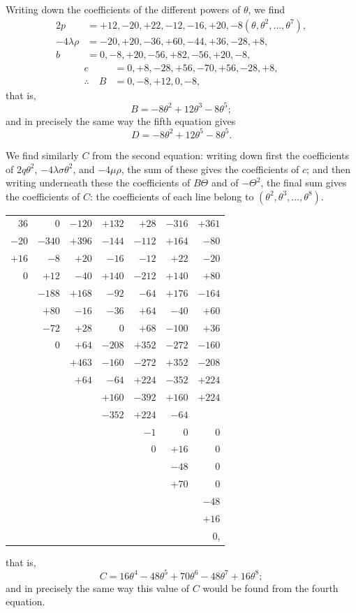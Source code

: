\documentclass[11pt,a4paper]{book}
\begin{document}
Writing down the coefficients of the different powers of $\theta$, we find
\begin{align*}
2p &= +12, -20, +22, -12, -16, +20, -8 (\theta, \theta^2, \ldots, \theta^7),\\
-4\lambda\rho &= -20, +20, -36, +60, -44, +36, -28, +8,\\
b &= 0, -8, +20, -56, +82, -56, +20, -8,
\end{align*}
\begin{align*}
e &= 0, +8, -28, +56, -70, +56, -28, +8,\\
\therefore\quad B &= 0, -8, +12, 0, -8,
\end{align*}
that is,
\[
B = -8\theta^2 + 12\theta^3 - 8\theta^5;
\]
and in precisely the same way the fifth equation gives
\[
D = -8\theta^2 + 12\theta^5 - 8\theta^5.
\]

We find similarly $C$ from the second equation: writing down first the coefficients of $2q\theta^2$, $-4\lambda\sigma\theta^2$, and $-4\mu\rho$, the sum of these gives the coefficients of $c$; and then writing underneath these the coefficients of $B\Theta$ and of $-\Theta^2$, the final sum gives the coefficients of $C$: the coefficients of each line belong to $(\theta^2, \theta^3, \ldots, \theta^8)$.
\begin{center}
\begin{tabular}{r@{\ }r@{\ }r@{\ }r@{\ }r@{\ }r@{\ }r}
36 & 0 & $-120$ & $+132$ & $+28$ & $-316$ & $+361$ \\
$-20$ & $-340$ & $+396$ & $-144$ & $-112$ & $+164$ & $-80$ \\
$+16$ & $-8$ & $+20$ & $-16$ & $-12$ & $+22$ & $-20$ \\
\midrule
0 & $+12$ & $-40$ & $+140$ & $-212$ & $+140$ & $+80$ \\
& $-188$ & $+168$ & $-92$ & $-64$ & $+176$ & $-164$ \\
& $+80$ & $-16$ & $-36$ & $+64$ & $-40$ & $+60$ \\
\midrule
& $-72$ & $+28$ & 0 & $+68$ & $-100$ & $+36$ \\
& 0 & $+64$ & $-208$ & $+352$ & $-272$ & $-160$ \\
\midrule
& & $+463$ & $-160$ & $-272$ & $+352$ & $-208$ \\
& & $+64$ & $-64$ & $+224$ & $-352$ & $+224$ \\
\midrule
& & & $+160$ & $-392$ & $+160$ & $+224$ \\
& & & $-352$ & $+224$ & $-64$ & \\
\midrule
& & & & $-1$ & 0 & 0 \\
& & & & 0 & $+16$ & 0 \\
\midrule
& & & & & $-48$ & 0 \\
& & & & & $+70$ & 0 \\
\midrule
& & & & & & $-48$ \\
& & & & & & $+16$ \\
\midrule
& & & & & & 0,
\end{tabular}
\end{center}
that is,
\[
C = 16\theta^4 - 48\theta^5 + 70\theta^6 - 48\theta^7 + 16\theta^8;
\]
and in precisely the same way this value of $C$ would be found from the fourth equation.
\end{document}
